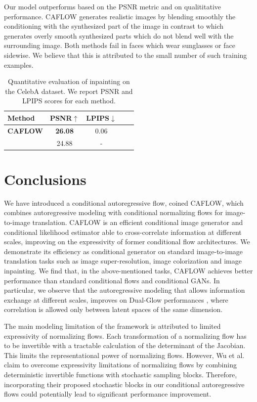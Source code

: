 Our model outperforms \cite{cGLOW} based on the PSNR metric and on qualititative performance. CAFLOW generates realistic images by blending smoothly the conditioning with the synthesized part of the image in contrast to \cite{cGLOW} which generates overly smooth synthesized parts which do not blend well with the surrounding image. Both methods fail in faces which wear sunglasses or face sidewise. We believe that this is attributed to the small number of such training examples.

\begin{table}[h!]
    \centering
    \caption{Quantitative evaluation of inpainting on the CelebA dataset. We report PSNR and LPIPS scores for each method.}\label{ch1:quantitative-evaluation-inpainting}
    \setlength{\tabcolsep}{3pt}
    \begin{tabular}{l|cccc}
     Method  &  PSNR$\uparrow$  &   LPIPS$\downarrow$    \\
    
    \midrule
      \textbf{CAFLOW} &  \textbf{26.08} & 0.06  \\
      \cite{cGLOW} & 24.88 & -
        
    \end{tabular}
    \end{table}

\section{Conclusions}\label{ch1:sec:conclusions}

We have introduced a conditional autoregressive flow, coined CAFLOW, which combines autoregressive modeling with conditional normalizing flows for image-to-image translation. CAFLOW is an efficient conditional image generator and conditional likelihood estimator able to cross-correlate information at different scales, improving on the expressivity of former conditional flow architectures. 
We demonstrate its efficiency as conditional generator on standard image-to-image translation tasks such as image super-resolution, image colorization and image inpainting. We find that, in the above-mentioned tasks, CAFLOW achieves better performance than standard conditional flows and conditional GANs. In particular, we observe that the autoregressive modeling that allows information exchange at different scales, improves on Dual-Glow performances \cite{Dual-Glow}, where correlation is allowed only between latent spaces of the same dimension.

The main modeling limitation of the framework is attributed to limited expressivity of normalizing flows. Each transformation of a normalizing flow has to be invertible with a tractable calculation of the determinant of the Jacobian. This limits the representational power of normalizing flows. However, Wu et al. \cite{wu2020stochastic} claim to overcome expressivity limitations of normalizing flows by combining deterministic invertible functions with stochastic sampling blocks. Therefore, incorporating their proposed stochastic blocks in our conditional autoregressive flows could potentially lead to significant performance improvement. 

